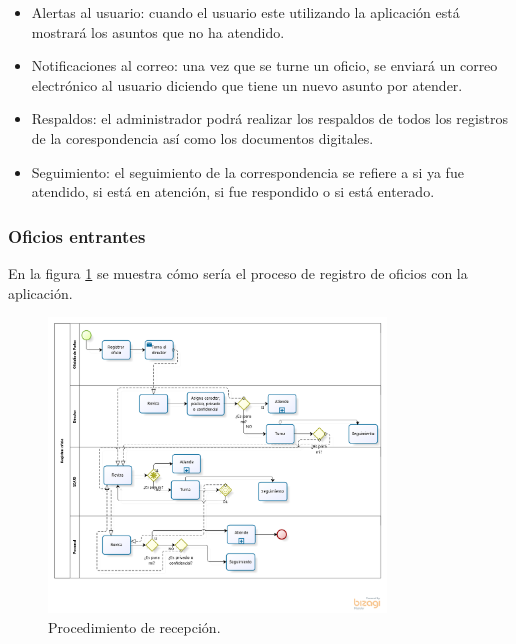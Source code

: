 \begin{itemize}
	\item Alertas al usuario: cuando el usuario este utilizando la aplicación está mostrará los asuntos que no ha atendido. 
	\item Notificaciones al correo: una vez que se turne un oficio, se enviará un correo electrónico al usuario diciendo que tiene un nuevo asunto por atender. 
	\item Respaldos: el administrador podrá realizar los respaldos de todos los registros de la corespondencia así como los documentos digitales.
	\item Seguimiento: el seguimiento de la correspondencia se refiere a si ya fue atendido, si está en atención, si fue respondido o si está enterado.
\end{itemize}

\subsubsection{Oficios entrantes}

En la figura \ref{Registro oficio} se muestra cómo sería el proceso de registro de oficios con la aplicación.

\begin{figure}[htbp!]
		\centering
			\includegraphics[width=0.8\textwidth]{images/propuesta/registrooficio}
		\caption{Procedimiento de recepción.}
		\label{Registro oficio}
	\end{figure}

